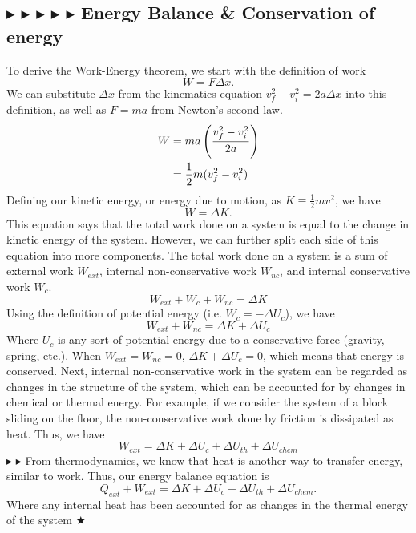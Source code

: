 \subsection{\color{OrangeRed} $\blacktriangleright$ \color{RoyalBlue} $\blacktriangleright$ \color{PineGreen} $\blacktriangleright$ \color{Goldenrod} $\blacktriangleright$ \color{Orchid} $\blacktriangleright$ \color{black} Energy Balance \& Conservation of energy}
To derive the Work-Energy theorem, we start with the definition of work
\begin{equation}
    W = F\Delta x.
\end{equation}
We can substitute $\Delta x$ from the kinematics equation $v_f^2-v_i^2=2a\Delta x$ into this definition, as well as $F=ma$ from Newton's second law.
\begin{align}
    W &= ma \left(\frac{v_f^2-v_i^2}{2a}\right) \nonumber \\
    &= \frac12 m(v_f^2-v_i^2)
\end{align}
Defining our kinetic energy, or energy due to motion, as $K \equiv \tfrac12mv^2$, we have
\begin{equation}
    \boxed{W=\Delta K}.
\end{equation}
This equation says that the total work done on a system is equal to the change in kinetic energy of the system. However, we can further split each side of this equation into more components. The total work done on a system is a sum of external work $W_{ext}$, internal non-conservative work $W_{nc}$, and internal conservative work $W_c$.
\begin{equation}
    W_{ext} + W_c + W_{nc} = \Delta K
\end{equation}
Using the definition of potential energy (i.e. $W_c = -\Delta U_c$), we have
\begin{equation}
    W_{ext} + W_{nc} = \Delta K + \Delta U_c
\end{equation}
Where $U_c$ is any sort of potential energy due to a conservative force (gravity, spring, etc.). When $W_{ext} = W_{nc} = 0$, $\Delta K + \Delta U_c = 0$, which means that energy is conserved. Next, internal non-conservative work in the system can be regarded as changes in the structure of the system, which can be accounted for by changes in chemical or thermal energy. For example, if we consider the system of a block sliding on the floor, the non-conservative work done by friction is dissipated as heat. Thus, we have
\begin{equation}
    \boxed{W_{ext} = \Delta K + \Delta U_c + \Delta U_{th} + \Delta U_{chem}}
\end{equation}
\noindent\color{RoyalBlue} $\blacktriangleright$ \color{Orchid} $\blacktriangleright$ \color{black} From thermodynamics, we know that heat is another way to transfer energy, similar to work. Thus, our energy balance equation is
\begin{equation}
    \boxed{Q_{ext} + W_{ext} = \Delta K + \Delta U_c + \Delta U_{th} + \Delta U_{chem}}.
\end{equation}
Where any internal heat has been accounted for as changes in the thermal energy of the system $\bigstar$

